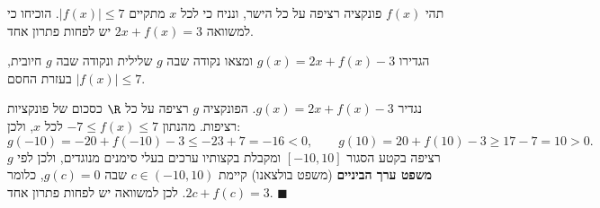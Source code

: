 
\begin{question}
תהי $f(x)$ פונקציה רציפה על כל הישר, ונניח כי לכל $x$ מתקיים $|f(x)|\le 7$. הוכיחו כי למשוואה $2x+f(x)=3$ יש לפחות פתרון אחד.
\end{question}

\begin{hint}
הגדירו $g(x)=2x+f(x)-3$ ומצאו נקודה שבה $g$ שלילית ונקודה שבה $g$ חיובית, בעזרת החסם $|f(x)|\le 7$.
\end{hint}

\begin{solution}
נגדיר $g(x)=2x+f(x)-3$. הפונקציה $g$ רציפה על כל $\R$ כסכום של פונקציות רציפות. מהנתון $-7\le f(x)\le 7$ לכל $x$, ולכן:
\[ g(-10)=-20+f(-10)-3\le -23+7=-16<0,\qquad g(10)=20+f(10)-3\ge 17-7=10>0. \]
$g$ רציפה בקטע הסגור $[-10,10]$ ומקבלת בקצותיו ערכים בעלי סימנים מנוגדים, ולכן לפי \textbf{משפט ערך הביניים} (משפט בולצאנו) קיימת $c\in(-10,10)$ שבה $g(c)=0$, כלומר $2c+f(c)=3$. לכן למשוואה יש לפחות פתרון אחד. $\blacksquare$
\end{solution}
